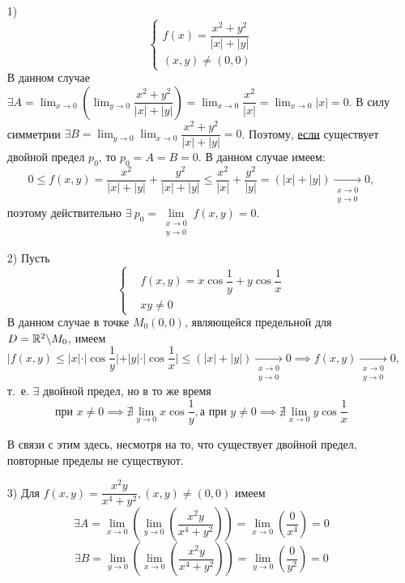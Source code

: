 \documentclass[../../main.tex]{subfiles}
\begin{document}
\begin{exmps}
\begin{itemize}
	\item[1)] 
	\[\left\{\begin{aligned}
		f(x) = \dfrac{x^2 + y^2}{|x| + |y|} \\
		(x, y) \ne (0, 0)
	\end{aligned}\right.\]
	В данном случае $\exists A = \displaystyle\lim_{x \to 0}
	{(\lim_{y \to 0}{ \dfrac{x^2 + y^2}{|x| + |y|} })} =
	\displaystyle \lim_{x \to 0}{\dfrac{x^2}{|x|}} =
	\displaystyle \lim_{x \to 0}{|x|} = 0$. В силу симметрии
	$\exists B = \displaystyle\lim_{y \to 0}
	{\lim_{x \to 0}{ \dfrac{x^2 + y^2}{|x| + |y|} }} = 0$.
	Поэтому, \underline{если} существует двойной предел $p_0$,
	то $p_0=A=B=0$. В данном случае имеем:
	\[
		0 \leq f(x, y) = 
		\dfrac{x^2}{|x| + |y|} + \dfrac{y^2}{|x| + |y|} \leq
		\dfrac{x^2}{|x|} + \dfrac{y^2}{|y|} = (|x| + |y|) 
		\underset{\substack{x \to 0 \\ y \to 0}}{\longrightarrow}0,
	\]
	поэтому действительно $\exists\ p_0 = \underset{\substack{x \to 0 \\ y \to 0}}
	{\lim}f(x, y) = 0$.
	
	\item[2)] Пусть \[\left\{\begin{aligned}
		&f(x, y) = x \cos{\dfrac{1}{y}} + y \cos{\dfrac{1}{x}} \\
		&xy \ne 0
	\end{aligned}\right.\]
	В данном случае в точке $M_0(0, 0)$, являющейся предельной для
	$D = \mathbb{R}^2 \backslash M_0$, имеем
	\[|f(x, y) \leq |x| \cdot |\cos{\dfrac{1}{y}}| + |y| \cdot 
	|\cos{\dfrac{1}{x}}| \leq (|x| + |y|) 
	\underset{\substack{x \to 0 \\ y \to 0}}{\longrightarrow}0 \implies
	f(x, y) \underset{\substack{x \to 0 \\ y \to 0}}{\longrightarrow}0,\] т.~е. 
	$\exists$ двойной предел, но в то же время 
	\[\text{при } x \ne 0 \implies \nexists \displaystyle \lim_{y \to 0}
	x \cos{\dfrac{1}{y}}, \text{а при } y \ne 0 \implies
	\nexists \displaystyle \lim_{x \to 0} y \cos{\dfrac{1}{x}}\] 
	
	В связи с этим здесь, несмотря на то, что существует двойной
	предел, повторные пределы не существуют.
	
	\item[3)] Для $f(x, y) = \dfrac{x^2 y}{x^4 + y^2}, (x, y) \ne (0, 0)$
	имеем \[\exists A = \displaystyle \lim_{x \to 0}
	{(\lim_{y \to 0}{( \dfrac{x^2 y}{x^4 + y^2} )})} =
	\lim_{x \to 0}{\left(\dfrac{0}{x^4}\right)} = 0\]
	\[\exists B = \displaystyle \lim_{y \to 0}
	{(\lim_{x \to 0}{( \dfrac{x^2 y}{x^4 + y^2} )})} =
	\lim_{y \to 0}{\left(\dfrac{0}{y^2}\right)} = 0\]
	

\end{itemize}
\end{exmps}
\end{document}
